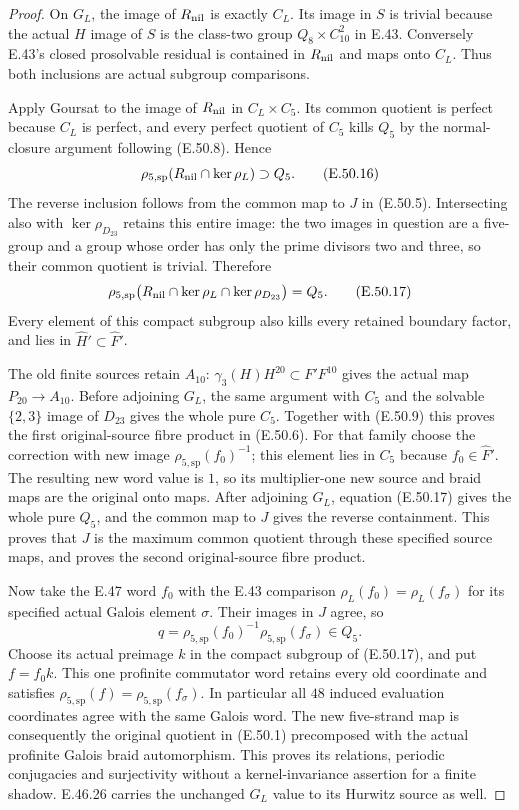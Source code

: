 \begin{proof}
On $G_L$, the image of $R_{\rm nil}$ is exactly
$C_L$.  Its image in $S$ is trivial because
the actual $H$ image of $S$ is the class-two
group $Q_8\times C_{10}^2$ in E.43.
Conversely E.43's closed prosolvable residual
is contained in $R_{\rm nil}$ and maps onto
$C_L$.  Thus both inclusions are actual
subgroup comparisons.

Apply Goursat to the image of $R_{\rm nil}$
in $C_L\times C_5$.  Its common quotient is
perfect because $C_L$ is perfect, and every
perfect quotient of $C_5$ kills $Q_5$ by the
normal-closure argument following
\textup{(E.50.8)}.  Hence
\[
 \rho_{5,\mathrm{sp}}
       (R_{\rm nil}\cap\ker\rho_L)\supset Q_5.
 \tag{E.50.16}
\]
The reverse inclusion follows from the common
map to $J$ in \textup{(E.50.5)}.  Intersecting
also with $\ker\rho_{D_{23}}$ retains this
entire image: the two images in question are
a five-group and a group whose order has
only the prime divisors two and three, so
their common quotient is trivial.  Therefore
\[
 \rho_{5,\mathrm{sp}}
 \bigl(R_{\rm nil}\cap\ker\rho_L
                     \cap\ker\rho_{D_{23}}\bigr)=Q_5.
 \tag{E.50.17}
\]
Every element of this compact subgroup also
kills every retained boundary factor, and
lies in $\widehat H'\subset\widehat F'$.

The old finite sources retain $A_{10}$:
$\gamma_3(H)H^{20}\subset F'F^{10}$ gives
the actual map $P_{20}\to A_{10}$.
Before adjoining $G_L$, the same argument
with $C_5$ and the solvable $\{2,3\}$ image
of $D_{23}$ gives the whole pure $C_5$.
Together with \textup{(E.50.9)} this proves
the first original-source fibre product in
\textup{(E.50.6)}.
For that family choose the correction with
new image $\rho_{5,\mathrm{sp}}(f_0)^{-1}$;
this element lies in $C_5$ because
$f_0\in\widehat F'$.
The resulting new word value is $1$, so
its multiplier-one new source and braid
maps are the original onto maps.
After adjoining $G_L$, equation
\textup{(E.50.17)} gives the whole pure
$Q_5$, and the common map to $J$ gives
the reverse containment.  This proves that
$J$ is the maximum common quotient through
these specified source maps, and proves
the second original-source fibre product.

Now take the E.47 word $f_0$ with the E.43
comparison
$\rho_L(f_0)=\rho_L(f_\sigma)$ for its
specified actual Galois element $\sigma$.
Their images in $J$ agree, so
\[
       q=\rho_{5,\mathrm{sp}}(f_0)^{-1}
                   \rho_{5,\mathrm{sp}}(f_\sigma)\in Q_5.
 \tag{E.50.18}
\]
Choose its actual preimage $k$ in the
compact subgroup of \textup{(E.50.17)},
and put $f=f_0k$.
This one profinite commutator word retains
every old coordinate and satisfies
$\rho_{5,\mathrm{sp}}(f)=
\rho_{5,\mathrm{sp}}(f_\sigma)$.
In particular all $48$ induced evaluation
coordinates agree with the same Galois word.
The new five-strand map is consequently
the original quotient in
\textup{(E.50.1)} precomposed with the
actual profinite Galois braid automorphism.
This proves its relations, periodic
conjugacies and surjectivity without a
kernel-invariance assertion for a finite
shadow.  E.46.26 carries the unchanged
$G_L$ value to its Hurwitz source as well.


\end{proof}
